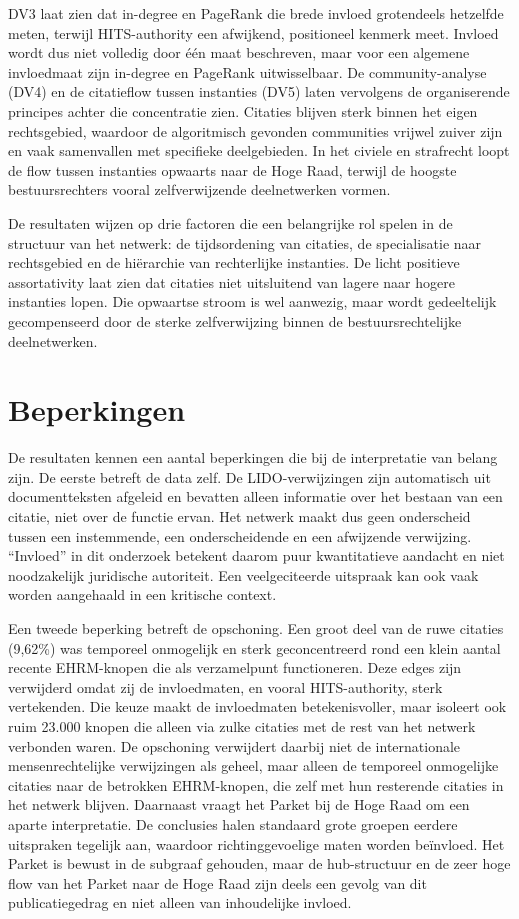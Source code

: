 \documentclass[a4paper, 12pt]{report}
\begin{document}
DV3 laat zien dat in-degree en PageRank die brede invloed grotendeels hetzelfde meten, terwijl HITS-authority een afwijkend, positioneel kenmerk meet. Invloed wordt dus niet volledig door één maat beschreven, maar voor een algemene invloedmaat zijn in-degree en PageRank uitwisselbaar. De community-analyse (DV4) en de citatieflow tussen instanties (DV5) laten vervolgens de organiserende principes achter die concentratie zien. Citaties blijven sterk binnen het eigen rechtsgebied, waardoor de algoritmisch gevonden communities vrijwel zuiver zijn en vaak samenvallen met specifieke deelgebieden. In het civiele en strafrecht loopt de flow tussen instanties opwaarts naar de Hoge Raad, terwijl de hoogste bestuursrechters vooral zelfverwijzende deelnetwerken vormen.

De resultaten wijzen op drie factoren die een belangrijke rol spelen in de structuur van het netwerk: de tijdsordening van citaties, de specialisatie naar rechtsgebied en de hiërarchie van rechterlijke instanties. De licht positieve assortativity laat zien dat citaties niet uitsluitend van lagere naar hogere instanties lopen. Die opwaartse stroom is wel aanwezig, maar wordt gedeeltelijk gecompenseerd door de sterke zelfverwijzing binnen de bestuursrechtelijke deelnetwerken.

 
\section{Beperkingen}
De resultaten kennen een aantal beperkingen die bij de interpretatie van belang zijn. De eerste betreft de data zelf. De LIDO-verwijzingen zijn automatisch uit documentteksten afgeleid en bevatten alleen informatie over het bestaan van een citatie, niet over de functie ervan. Het netwerk maakt dus geen onderscheid tussen een instemmende, een onderscheidende en een afwijzende verwijzing. ``Invloed'' in dit onderzoek betekent daarom puur kwantitatieve aandacht en niet noodzakelijk juridische autoriteit. Een veelgeciteerde uitspraak kan ook vaak worden aangehaald in een kritische context.

Een tweede beperking betreft de opschoning. Een groot deel van de ruwe citaties (9,62\%) was temporeel onmogelijk en sterk geconcentreerd rond een klein aantal recente EHRM-knopen die als verzamelpunt functioneren. Deze edges zijn verwijderd omdat zij de invloedmaten, en vooral HITS-authority, sterk vertekenden. Die keuze maakt de invloedmaten betekenisvoller, maar isoleert ook ruim 23.000 knopen die alleen via zulke citaties met de rest van het netwerk verbonden waren. De opschoning verwijdert daarbij niet de internationale mensenrechtelijke verwijzingen als geheel, maar alleen de temporeel onmogelijke citaties naar de betrokken EHRM-knopen, die zelf met hun resterende citaties in het netwerk blijven. Daarnaast vraagt het Parket bij de Hoge Raad om een aparte interpretatie. De conclusies halen standaard grote groepen eerdere uitspraken tegelijk aan, waardoor richtinggevoelige maten worden beïnvloed. Het Parket is bewust in de subgraaf gehouden, maar de hub-structuur en de zeer hoge flow van het Parket naar de Hoge Raad zijn deels een gevolg van dit publicatiegedrag en niet alleen van inhoudelijke invloed.
\end{document}
